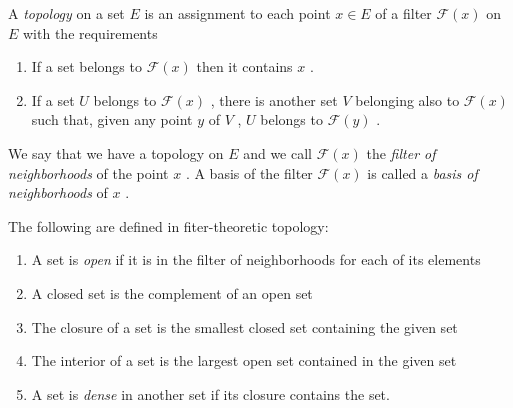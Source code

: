 \begin{defn}
	A \textit{topology} on a set $ E $ is an assignment to each point $ x \in E $ of a filter $ \mathcal{F} (x) $ on $ E $ with the requirements
	\begin{enumerate}
		\item If a set belongs to $ \mathcal{F} (x) $ then it contains $ x $ .
		\item If a set $ U $ belongs to $ \mathcal{F} (x) $ , there is another set $ V $ belonging also to $ \mathcal{F} (x) $  such that, given any point $ y $ of $ V $ , $ U $ belongs to $ \mathcal{F} (y) $ .
	\end{enumerate}
	We say that we have a topology on $ E $ and we call $ \mathcal{F} (x) $ the \textit{filter of neighborhoods} of the point $ x $ . A basis of the filter $ \mathcal{F} (x)  $ is called a \textit{basis of neighborhoods} of $ x $ .
\end{defn}

\begin{defn}
	The following are defined in fiter-theoretic topology:
	\begin{enumerate}
		\item A set is \textit{open} if it is in the filter of neighborhoods for each of its elements
		\item A closed set is the complement of an open set
		\item The closure of a set is the smallest closed set containing the given set
		\item The interior of a set is the largest open set contained in the given set
		\item A set is \textit{dense} in another set if its closure contains the set.
	\end{enumerate}
	
\end{defn}


